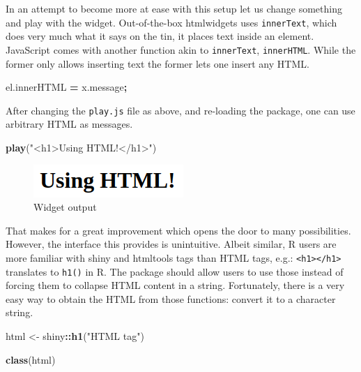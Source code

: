 \documentclass[
]{krantz}
\makeatletter
\newenvironment{Shaded}{\begin{snugshade}}{\end{snugshade}}
\newcommand{\AttributeTok}[1]{\textcolor[rgb]{0.61,0.61,0.61}{#1}}
\newcommand{\KeywordTok}[1]{\textcolor[rgb]{0.27,0.27,0.27}{\textbf{#1}}}
\newcommand{\NormalTok}[1]{#1}
\newcommand{\OperatorTok}[1]{\textcolor[rgb]{0.43,0.43,0.43}{\textbf{#1}}}
\newcommand{\StringTok}[1]{\textcolor[rgb]{0.5,0.5,0.5}{#1}}
\newcommand{\VariableTok}[1]{\textcolor[rgb]{0,0,0}{#1}}
\newenvironment{kframe}{%
\medskip{}
\setlength{\fboxsep}{.8em}
 \def\at@end@of@kframe{}%
 \ifinner\ifhmode%
  \def\at@end@of@kframe{\end{minipage}}%
  \begin{minipage}{\columnwidth}%
 \fi\fi%
 \def\FrameCommand##1{\hskip\@totalleftmargin \hskip-\fboxsep
 \colorbox{shadecolor}{##1}\hskip-\fboxsep
     \hskip-\linewidth \hskip-\@totalleftmargin \hskip\columnwidth}%
 \MakeFramed {\advance\hsize-\width
   \@totalleftmargin\z@ \linewidth\hsize
   \@setminipage}}%
 {\par\unskip\endMakeFramed%
 \at@end@of@kframe}
\renewenvironment{Shaded}{\begin{kframe}}{\end{kframe}}
\makeatother
\begin{document}
In an attempt to become more at ease with this setup let us change something and play with the widget. Out-of-the-box htmlwidgets uses \texttt{innerText}, which does very much what it says on the tin, it places text inside an element. JavaScript comes with another function akin to \texttt{innerText}, \texttt{innerHTML}. While the former only allows inserting text the former lets one insert any HTML.

\begin{Shaded}
\begin{Highlighting}[]
\VariableTok{el}\NormalTok{.}\AttributeTok{innerHTML} \OperatorTok{=} \VariableTok{x}\NormalTok{.}\AttributeTok{message}\OperatorTok{;}
\end{Highlighting}
\end{Shaded}

After changing the \texttt{play.js} file as above, and re-loading the package, one can use arbitrary HTML as messages.

\begin{Shaded}
\begin{Highlighting}[]
\KeywordTok{play}\NormalTok{(}\StringTok{"<h1>Using HTML!</h1>"}\NormalTok{)}
\end{Highlighting}
\end{Shaded}

\begin{figure}
\centering
\includegraphics{images/playground-h1.png}
\caption{Widget output}
\end{figure}

That makes for a great improvement which opens the door to many possibilities. However, the interface this provides is unintuitive. Albeit similar, R users are more familiar with shiny and htmltools \citep{R-htmltools} tags than HTML tags, e.g.: \texttt{\textless{}h1\textgreater{}\textless{}/h1\textgreater{}} translates to \texttt{h1()} in R. The package should allow users to use those instead of forcing them to collapse HTML content in a string. Fortunately, there is a very easy way to obtain the HTML from those functions: convert it to a character string.

\begin{Shaded}
\begin{Highlighting}[]
\NormalTok{html <{-}}\StringTok{ }\NormalTok{shiny}\OperatorTok{::}\KeywordTok{h1}\NormalTok{(}\StringTok{"HTML tag"}\NormalTok{)}

\KeywordTok{class}\NormalTok{(html)}
\end{Highlighting}
\end{Shaded}
\end{document}
